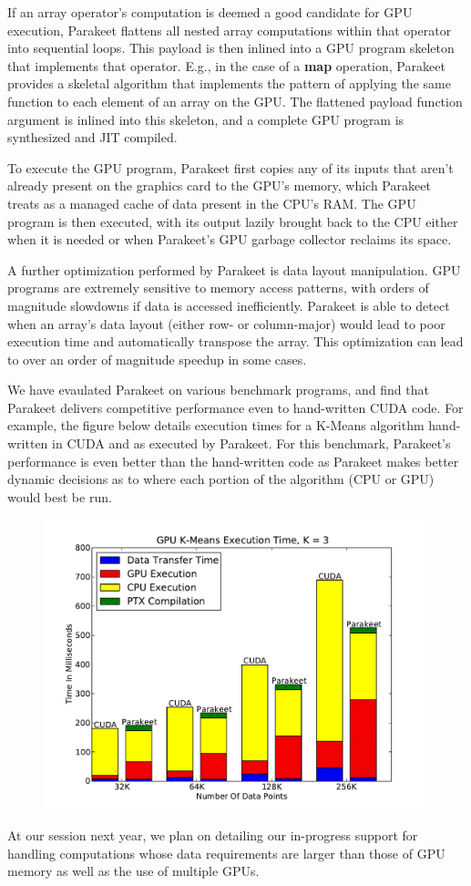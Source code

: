 \documentclass[10pt,twocolumn]{article}
\begin{document}
If an array operator's computation is deemed a good candidate for GPU execution, Parakeet flattens all nested array computations within that operator into sequential loops.  This payload is then inlined into a GPU program skeleton that implements that operator.  E.g., in the case of a \textbf{map} operation, Parakeet provides a skeletal algorithm that implements the pattern of applying the same function to each element of an array on the GPU.  The flattened payload function argument is inlined into this skeleton, and a complete GPU program is synthesized and JIT compiled.

To execute the GPU program, Parakeet first copies any of its inputs that aren't already present on the graphics card to the GPU's memory, which Parakeet treats as a managed cache of data present in the CPU's RAM. The GPU program is then executed, with its output lazily brought back to the CPU either when it is needed or when Parakeet's GPU garbage collector reclaims its space.

A further optimization performed by Parakeet is data layout manipulation.  GPU programs are extremely sensitive to memory access patterns, with orders of magnitude slowdowns if data is accessed inefficiently.  Parakeet is able to detect when an array's data layout (either row- or column-major) would lead to poor execution time and automatically transpose the array.  This optimization can lead to over an order of magnitude speedup in some cases.

We have evaulated Parakeet on various benchmark programs, and find that Parakeet delivers competitive performance even to hand-written CUDA code.  For example, the figure below details execution times for a K-Means algorithm hand-written in CUDA and as executed by Parakeet.  For this benchmark, Parakeet's performance is even better than the hand-written code as Parakeet makes better dynamic decisions as to where each portion of the algorithm (CPU or GPU) would best be run.

\begin{figure}[h!]
\includegraphics[scale=0.4]{KMGPU.pdf}
\label{BSGPU}
\end{figure}

At our session next year, we plan on detailing our in-progress support for handling computations whose data requirements are larger than those of GPU memory as well as the use of multiple GPUs.
\end{document}
